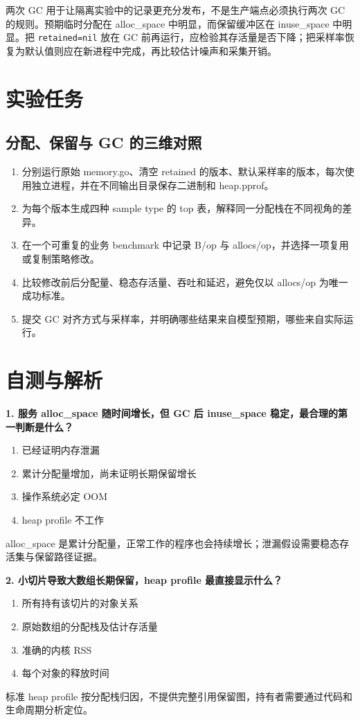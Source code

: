 \documentclass[UTF8,fontset=fandol,openany,11pt]{ctexbook}
\begin{document}
两次 GC 用于让隔离实验中的记录更充分发布，不是生产端点必须执行两次 GC 的规则。预期临时分配在 alloc\_space 中明显，而保留缓冲区在 inuse\_space 中明显。把 \texttt{retained=nil} 放在 GC 前再运行，应检验其存活量是否下降；把采样率恢复为默认值则应在新进程中完成，再比较估计噪声和采集开销。

\section{实验任务}
\subsection*{分配、保留与 GC 的三维对照}
\begin{enumerate}
\item 分别运行原始 memory.go、清空 retained 的版本、默认采样率的版本，每次使用独立进程，并在不同输出目录保存二进制和 heap.pprof。

\item 为每个版本生成四种 sample type 的 top 表，解释同一分配栈在不同视角的差异。

\item 在一个可重复的业务 benchmark 中记录 B/op 与 allocs/op，并选择一项复用或复制策略修改。

\item 比较修改前后分配量、稳态存活量、吞吐和延迟，避免仅以 allocs/op 为唯一成功标准。

\item 提交 GC 对齐方式与采样率，并明确哪些结果来自模型预期，哪些来自实际运行。

\end{enumerate}
\section{自测与解析}
\noindent\textbf{1. 服务 alloc\_space 随时间增长，但 GC 后 inuse\_space 稳定，最合理的第一判断是什么？}
\begin{enumerate}[label=\Alph*.]
\item 已经证明内存泄漏
\item 累计分配量增加，尚未证明长期保留增长
\item 操作系统必定 OOM
\item heap profile 不工作
\end{enumerate}
alloc\_space 是累计分配量，正常工作的程序也会持续增长；泄漏假设需要稳态存活集与保留路径证据。

\noindent\textbf{2. 小切片导致大数组长期保留，heap profile 最直接显示什么？}
\begin{enumerate}[label=\Alph*.]
\item 所有持有该切片的对象关系
\item 原始数组的分配栈及估计存活量
\item 准确的内核 RSS
\item 每个对象的释放时间
\end{enumerate}
标准 heap profile 按分配栈归因，不提供完整引用保留图，持有者需要通过代码和生命周期分析定位。
\end{document}
